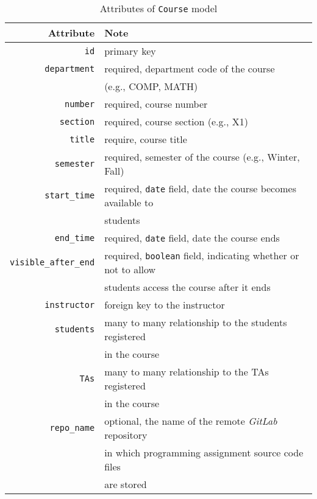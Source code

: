 \begin{table}[H]
    \centering
    \caption{Attributes of \texttt{Course} model}
    \label{tab:COURSE_ATTR}
    \begin{tabular}[ht]{r|l}
        \hline
        Attribute & Note \\
        \hline
        \hline
        \texttt{id} & primary key \\
        \hline
        \texttt{department} & required, department code of the course \\ & (e.g., COMP, MATH) \\
        \hline
        \texttt{number} & required, course number \\
        \hline
        \texttt{section} & required, course section (e.g., X1) \\
        \hline
        \texttt{title} & require, course title \\
        \hline
        \texttt{semester} & required, semester of the course (e.g., Winter, Fall) \\
        \hline
        \texttt{start\_time} & required, \texttt{date} field, date the course
            becomes available to \\ & students \\
        \hline
        \texttt{end\_time} & required, \texttt{date} field, date the course ends \\
        \hline
        \texttt{visible\_after\_end} & required, \texttt{boolean} field, indicating
            whether or not to allow\\ & students access the course after it ends \\

        \hline
        \hline

        \texttt{instructor} & foreign key to the instructor \\
        \hline
        \texttt{students} & many to many relationship to the students registered \\ & in the course\\
        \hline
        \texttt{TAs} & many to many relationship to the TAs registered \\ & in the course \\

        \hline
        \hline

        \texttt{repo\_name} & optional, the name of the remote \emph{GitLab}
            repository \\ & in 
            which programming assignment source code files \\ & are stored \\
        \hline
        \hline


\end{tabular}
\end{table}
